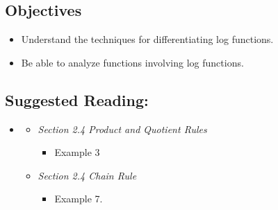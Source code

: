 \vspace{-0.25 in}
\begin{framed}
\subsection*{Objectives}
\begin{itemize}
    \item Understand the techniques for differentiating log functions.
    \item Be able to analyze functions involving log functions.
\end{itemize}

\subsection*{Suggested Reading:}
\begin{itemize}
\item \cite{Calaway}\footnotemark[1]
   \begin{itemize}
        \item \emph{Section 2.4 Product and Quotient Rules}
        \begin{itemize}
            \item Example 3
        \end{itemize}
    \end{itemize}
    \begin{itemize}
        \item \emph{Section 2.4 Chain Rule}
        \begin{itemize}
            \item Example 7.
        \end{itemize}
    \end{itemize}


\end{itemize}
\end{framed}
